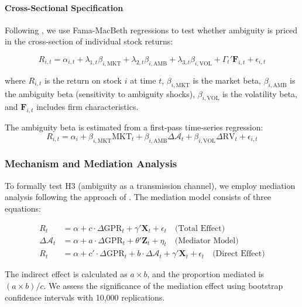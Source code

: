 \documentclass[preprint,12pt,authoryear]{elsarticle}
\begin{document}
\paragraph{Cross-Sectional Specification}
Following \citet{Fama1992Cross}, we use Fama-MacBeth regressions to test whether ambiguity is priced in the cross-section of individual stock returns:

\begin{equation}
R_{i,t} = \alpha_{i,t} + \lambda_{1,t} \beta_{i,\text{MKT}} + \lambda_{2,t} \beta_{i,\text{AMB}} + \lambda_{3,t} \beta_{i,\text{VOL}} + \Gamma_{t}' \mathbf{F}_{i,t} + \epsilon_{i,t}
\end{equation}

where $R_{i,t}$ is the return on stock $i$ at time $t$, $\beta_{i,\text{MKT}}$ is the market beta, $\beta_{i,\text{AMB}}$ is the ambiguity beta (sensitivity to ambiguity shocks), $\beta_{i,\text{VOL}}$ is the volatility beta, and $\mathbf{F}_{i,t}$ includes firm characteristics.

The ambiguity beta is estimated from a first-pass time-series regression:
\begin{equation}
R_{i,t} = \alpha_i + \beta_{i,\text{MKT}} \text{MKT}_t + \beta_{i,\text{AMB}} \Delta \mathcal{A}_t + \beta_{i,\text{VOL}} \Delta \text{RV}_t + \epsilon_{i,t}
\end{equation}

\subsubsection{Mechanism and Mediation Analysis}

To formally test H3 (ambiguity as a transmission channel), we employ mediation analysis following the approach of \citet{Baron1986Moderator}. The mediation model consists of three equations:

\begin{align}
R_{t} &= \alpha + c \cdot \Delta \text{GPR}_{t} + \gamma' \mathbf{X}_{t} + \epsilon_{t} \quad \text{(Total Effect)} \\
\Delta \mathcal{A}_{t} &= \alpha + a \cdot \Delta \text{GPR}_{t} + \theta' \mathbf{Z}_{t} + \eta_{t} \quad \text{(Mediator Model)} \\
R_{t} &= \alpha + c' \cdot \Delta \text{GPR}_{t} + b \cdot \Delta \mathcal{A}_{t} + \gamma' \mathbf{X}_{t} + \epsilon_{t} \quad \text{(Direct Effect)}
\end{align}

The indirect effect is calculated as $a \times b$, and the proportion mediated is $(a \times b) / c$. We assess the significance of the mediation effect using bootstrap confidence intervals with 10,000 replications.
\end{document}
